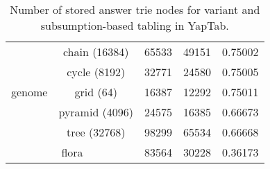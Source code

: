 \begin{table}[ht]
{\begin{tabular}{cc|ccc}
   \multirow{5}{*}{genome} &  \footnotesize{chain (16384)} &  65533 & 49151 &  0.75002 \\
   &  \footnotesize{cycle (8192)} &  32771 & 24580 &  0.75005 \\
   &  \footnotesize{grid (64)} &  16387 & 12292 &  0.75011 \\
   &  \footnotesize{pyramid (4096)} &  24575 & 16385 &  0.66673 \\
   &  \footnotesize{tree (32768)} &  98299 & 65534 &  0.66668 \\
   \hline
  
\multicolumn{2}{c|}{flora} & 83564 & 30228 & 0.36173 \\
\hline
\hline
\end{tabular}
}
\caption{Number of stored answer trie nodes for variant and subsumption-based tabling in YapTab.}
\label{tbl:results_detail_space_sub}
\end{table}
